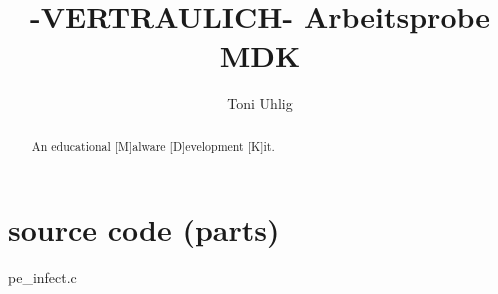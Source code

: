 \documentclass{article}
\begin{document}
\title{-VERTRAULICH- Arbeitsprobe MDK}
\author{Toni Uhlig}

\maketitle

\begin{abstract}
An educational [M]alware [D]evelopment [K]it.
\end{abstract}

\section{source code (parts)}
pe\_infect.c
\end{document}
